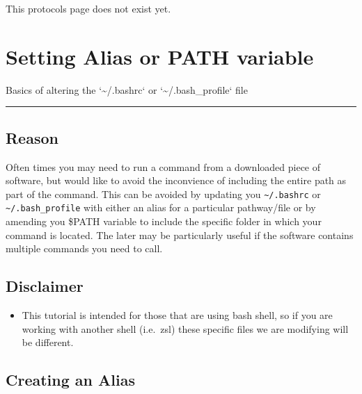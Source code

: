 \documentclass[
  letterpaper,
  DIV=11,
  numbers=noendperiod]{scrreprt}
\providecommand{\tightlist}{%
  \setlength{\itemsep}{0pt}\setlength{\parskip}{0pt}}\usepackage{longtable,booktabs,array}
\begin{document}
This protocols page does not exist yet.

\hypertarget{setting-alias-or-path-variable}{%
\chapter{Setting Alias or PATH
variable}\label{setting-alias-or-path-variable}}

Basics of altering the `\textasciitilde/.bashrc` or
`\textasciitilde/.bash\_profile` file

\begin{center}\rule{0.5\linewidth}{0.5pt}\end{center}

\hypertarget{reason}{%
\section*{\texorpdfstring{\textbf{Reason}}{Reason}}\label{reason}}

Often times you may need to run a command from a downloaded piece of
software, but would like to avoid the inconvience of including the
entire path as part of the command. This can be avoided by updating you
\texttt{\textasciitilde{}/.bashrc} or
\texttt{\textasciitilde{}/.bash\_profile} with either an alias for a
particular pathway/file or by amending you \$PATH variable to include
the specific folder in which your command is located. The later may be
particularly useful if the software contains multiple commands you need
to call.

\hypertarget{disclaimer}{%
\section*{\texorpdfstring{\textbf{Disclaimer}}{Disclaimer}}\label{disclaimer}}

\begin{itemize}
\tightlist
\item
  This tutorial is intended for those that are using bash shell, so if
  you are working with another shell (i.e.~zsl) these specific files we
  are modifying will be different.
\end{itemize}

\hypertarget{creating-an-alias}{%
\section*{\texorpdfstring{\textbf{Creating an
Alias}}{Creating an Alias}}\label{creating-an-alias}}
\end{document}
